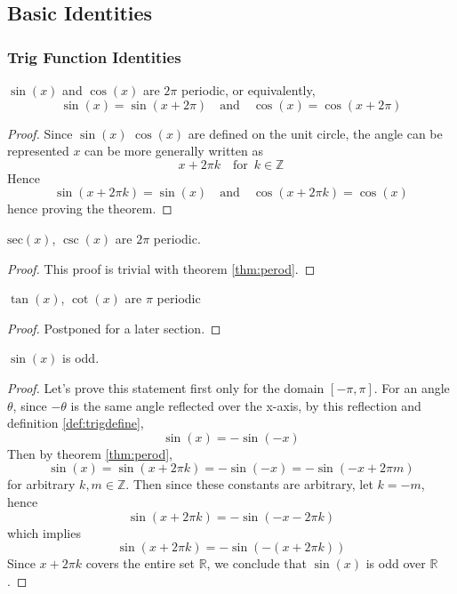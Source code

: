 \documentclass[11pt]{article}
\numberwithin{lemma}{section}
\numberwithin{equation}{section}
\numberwithin{define}{section}
\numberwithin{prop}{section}
\numberwithin{figure}{section}
\numberwithin{theorem}{section}
\numberwithin{cor}{section}
\newcounter{ex}[section]
\numberwithin{ex}{section}
\def\real{\mathbb{R}}
\def\integ{\mathbb{Z}}
\def\jand{\quad\text{and}\quad}
\def\for{\quad\text{for }\,}
\begin{document}
\subsection{Basic Identities}
\subsubsection{Trig Function Identities}
\begin{theorem}
\label{thm:perod}
$\sin(x)$ and $\cos(x)$ are $2\pi$ periodic, or equivalently,
$$\sin(x)=\sin(x+2\pi) \jand \cos(x)=\cos(x+2\pi)$$
\end{theorem}
\begin{proof}
	Since $\sin(x)$ $\cos(x)$ are defined on the unit circle, the angle can be represented $x$ can be more generally written as
	$$x+2\pi k \for k\in\integ$$
	Hence
	$$\sin(x+2\pi k)=\sin(x) \jand
	\cos(x+2\pi k)=\cos(x)$$
	hence proving the theorem.
\end{proof}

\begin{cor}
	$\text{sec}(x)$, $\csc(x)$ are $2\pi$ periodic.
\end{cor}
\begin{proof}
	This proof is trivial with theorem \eqref{thm:perod}.
\end{proof}

\begin{theorem}
$\tan(x)$, $\cot(x)$ are $\pi$ periodic
\label{thm:tanperodic}
\end{theorem}
\begin{proof}
	Postponed for a later section.
\end{proof}

\begin{theorem}
	$\sin(x)$ is odd.
	\label{thm:sinodd}
\end{theorem}
\begin{proof}
	Let's prove this statement first only for the domain $[-\pi,\pi]$.
	For an angle $\theta$, since $-\theta$ is the same angle reflected over the x-axis, by this reflection and definition \eqref{def:trigdefine},
	$$\sin(x)=-\sin(-x)$$
	Then by theorem \eqref{thm:perod},
	$$\sin(x)=\sin(x+2\pi k)=-\sin(-x)=-\sin(-x+2\pi m)$$
	for arbitrary $k,m\in\integ$. Then since these constants are arbitrary, let $k=-m$, hence
	$$\sin(x+2\pi k)=-\sin(-x-2\pi k)$$
	which implies
	$$\sin(x+2\pi k)=-\sin(-(x+2\pi k))$$
	Since $x+2\pi k$ covers the entire set $\real$, we conclude that $\sin(x)$ is odd over $\real$.
\end{proof}
\end{document}
